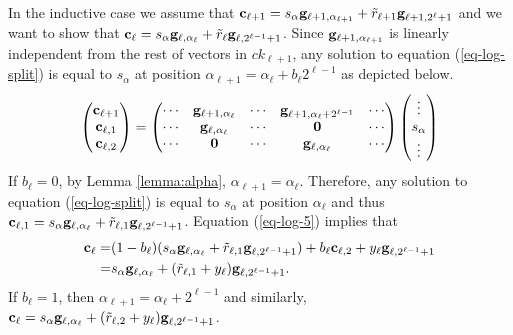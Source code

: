 In the inductive case we assume that \(\mathbf{c}_{\ell+1}=s_{\alpha}\mathbf{g}_{\ell+1,\alpha_{\ell+1}}+\tilde{r}_{\ell+1}\mathbf{g}_{\ell+1,2^\ell+1}\) and we want to show that $\mathbf{c}_\ell = s_\alpha\mathbf{g}_{\ell,\alpha_\ell}+\tilde{r}_\ell\mathbf{g}_{\ell,2^{\ell-1}+1}$. Since \(\mathbf{g}_{\ell+1,\alpha_{\ell+1}}\) is linearly independent from the rest of vectors in \(ck_{\ell+1}\), any solution to equation (\ref{eq-log-split}) is equal to \(s_{\alpha}\) at position \(\alpha_{\ell+1}=\alpha_\ell+b_\ell2^{\ell-1}\) as depicted below.
\begin{align*}
\left(\begin{matrix}\mathbf{c}_{\ell+1}\\\mathbf{c}_{\ell,1}\\\mathbf{c}_{\ell,2}\end{matrix}\right)=
\left(\begin{matrix}
\cdots & \mathbf{g}_{\ell+1,\alpha_\ell} & \cdots  & \mathbf{g}_{\ell+1,\alpha_\ell+2^{\ell-1}} & \cdots\\
\cdots & \mathbf{g}_{\ell,\alpha_\ell}     & \cdots  & \mathbf{0}                           & \cdots\\
\cdots & \mathbf{0}                        & \cdots  & \mathbf{g}_{\ell,\alpha_\ell}        & \cdots
\end{matrix}\right)
\left(\begin{matrix}\vdots\\s_\alpha\\\vdots\end{matrix}\right)
\end{align*}
If $b_{\ell}=0$, by Lemma \ref{lemma:alpha}, $\alpha_{\ell+1}=\alpha_\ell$. Therefore, any solution to equation (\ref{eq-log-split}) is equal to $s_\alpha$ at position $\alpha_\ell$ and thus $\mathbf{c}_{\ell,1} = s_\alpha\mathbf{g}_{\ell,\alpha_\ell}+\tilde{r}_{\ell,1}\mathbf{g}_{\ell,2^{\ell-1}+1}$.
Equation (\ref{eq-log-5}) implies that
\begin{align*}
\mathbf{c}_{\ell}=&(1-b_\ell)(s_\alpha\mathbf{g}_{\ell,\alpha_\ell}+\tilde{r}_{\ell,1}\mathbf{g}_{\ell,2^{\ell-1}+1})+b_\ell\mathbf{c}_{\ell,2}+y_\ell\mathbf{g}_{\ell,2^{\ell-1}+1}\\
               =& s_\alpha\mathbf{g}_{\ell,\alpha_\ell}+(\tilde{r}_{\ell,1}+y_\ell)\mathbf{g}_{\ell,2^{\ell-1}+1}.
\end{align*}
If $b_{\ell}=1$, then $\alpha_{\ell+1}=\alpha_\ell+2^{\ell-1}$ and similarly, $\mathbf{c}_{\ell}=s_\alpha\mathbf{g}_{\ell,\alpha_\ell}+(\tilde{r}_{\ell,2}+y_\ell)\mathbf{g}_{\ell,2^{\ell-1}+1}$.



